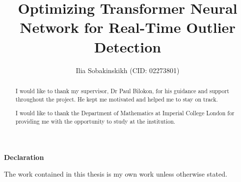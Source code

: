 \documentclass[a4paper, twoside]{report}
\title{Optimizing Transformer Neural Network for Real-Time Outlier Detection}
\author{Ilia Sobakinskikh  (CID: 02273801)}
\theoremstyle{definition}
\numberwithin{equation}{section}
\begin{document}


\mbox{}\newline\vspace{10mm} \mbox{}\LARGE
%
{\bf Declaration} \normalsize \vspace{5mm}

The work contained in this thesis is my own work unless otherwise stated.

\newpage

\renewcommand{\abstractname}{Acknowledgements}
\begin{abstract}
    I would like to thank my supervisor, Dr Paul Bilokon, for his guidance and support throughout the project.
    He kept me motivated and helped me to stay on track.

    I would like to thank the Department of Mathematics at Imperial College London for providing me with the
    opportunity to study at the institution.
\end{abstract}

\newpage
\end{document}
